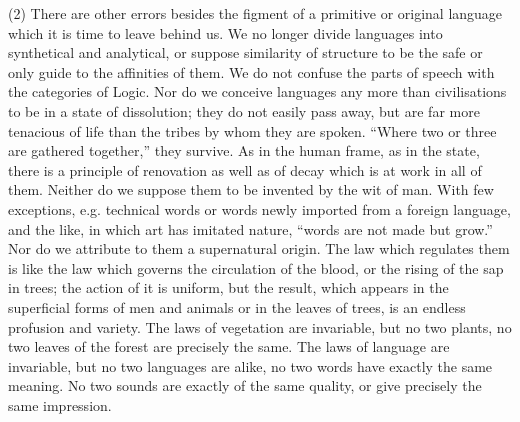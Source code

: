 \documentclass[11pt,letter]{article}
\begin{document}
\par  (2) There are other errors besides the figment of a primitive or original language which it is time to leave behind us. We no longer divide languages into synthetical and analytical, or suppose similarity of structure to be the safe or only guide to the affinities of them. We do not confuse the parts of speech with the categories of Logic. Nor do we conceive languages any more than civilisations to be in a state of dissolution; they do not easily pass away, but are far more tenacious of life than the tribes by whom they are spoken. “Where two or three are gathered together,” they survive. As in the human frame, as in the state, there is a principle of renovation as well as of decay which is at work in all of them. Neither do we suppose them to be invented by the wit of man. With few exceptions, e.g. technical words or words newly imported from a foreign language, and the like, in which art has imitated nature, “words are not made but grow.” Nor do we attribute to them a supernatural origin. The law which regulates them is like the law which governs the circulation of the blood, or the rising of the sap in trees; the action of it is uniform, but the result, which appears in the superficial forms of men and animals or in the leaves of trees, is an endless profusion and variety. The laws of vegetation are invariable, but no two plants, no two leaves of the forest are precisely the same. The laws of language are invariable, but no two languages are alike, no two words have exactly the same meaning. No two sounds are exactly of the same quality, or give precisely the same impression.
\end{document}
